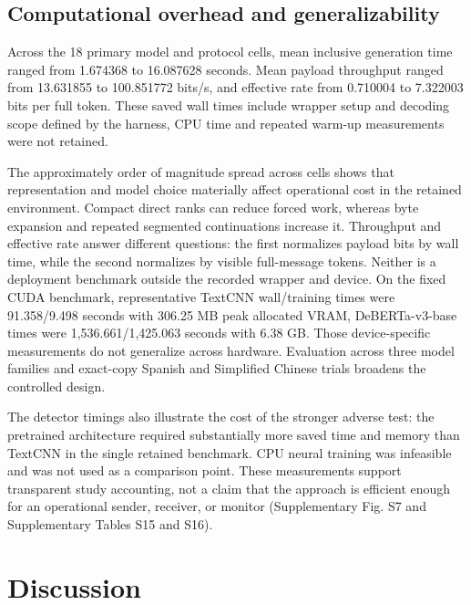 \documentclass[fleqn,10pt]{wlscirep}
\begin{document}
\subsection*{Computational overhead and generalizability}\label{sec:results-overhead}

Across the 18 primary model and protocol cells, mean inclusive generation time ranged from 1.674368 to 16.087628 seconds. Mean payload throughput ranged from 13.631855 to 100.851772 bits/s, and effective rate from 0.710004 to 7.322003 bits per full token. These saved wall times include wrapper setup and decoding scope defined by the harness, CPU time and repeated warm-up measurements were not retained.

The approximately order of magnitude spread across cells shows that representation and model choice materially affect operational cost in the retained environment. Compact direct ranks can reduce forced work, whereas byte expansion and repeated segmented continuations increase it. Throughput and effective rate answer different questions: the first normalizes payload bits by wall time, while the second normalizes by visible full-message tokens. Neither is a deployment benchmark outside the recorded wrapper and device.
On the fixed CUDA benchmark, representative TextCNN wall/training times were 91.358/9.498 seconds with 306.25 MB peak allocated VRAM, DeBERTa-v3-base times were 1,536.661/1,425.063 seconds with 6.38 GB. Those device-specific measurements do not generalize across hardware. Evaluation across three model families and exact-copy Spanish and Simplified Chinese trials broadens the controlled design.%

The detector timings also illustrate the cost of the stronger adverse test: the pretrained architecture required substantially more saved time and memory than TextCNN in the single retained benchmark. CPU neural training was infeasible and was not used as a comparison point. These measurements support transparent study accounting, not a claim that the approach is efficient enough for an operational sender, receiver, or monitor (Supplementary Fig. S7 and Supplementary Tables S15 and S16).




\section*{Discussion}\label{sec:discussion}
\end{document}
